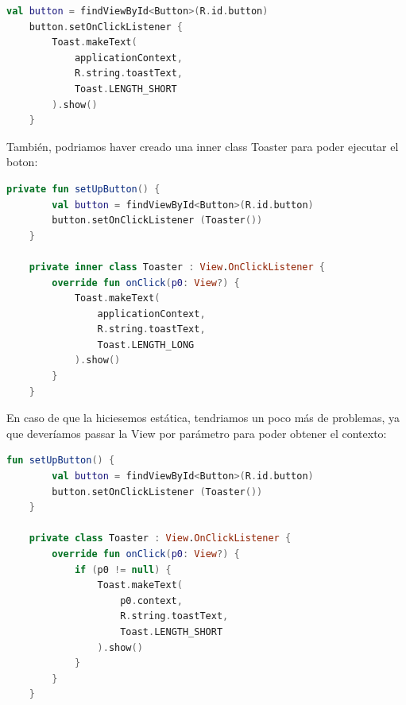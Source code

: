 \documentclass[12pt, letterpaper]{article}
\begin{document}
\begin{lstlisting}[language=Kotlin]
    val button = findViewById<Button>(R.id.button)
    button.setOnClickListener {
        Toast.makeText(
            applicationContext,
            R.string.toastText,
            Toast.LENGTH_SHORT
        ).show()
    }
\end{lstlisting}

También, podriamos haver creado una inner class Toaster para poder ejecutar el boton:
\begin{lstlisting}[language=Kotlin]
    private fun setUpButton() {
        val button = findViewById<Button>(R.id.button)
        button.setOnClickListener (Toaster())
    }

    private inner class Toaster : View.OnClickListener {
        override fun onClick(p0: View?) {
            Toast.makeText(
                applicationContext,
                R.string.toastText,
                Toast.LENGTH_LONG
            ).show()
        }
    }
\end{lstlisting}

En caso de que la hiciesemos estática, tendriamos un poco más de problemas, ya que deveríamos passar la View por parámetro para poder obtener el contexto:
\begin{lstlisting}[language=Kotlin]
    fun setUpButton() {
        val button = findViewById<Button>(R.id.button)
        button.setOnClickListener (Toaster())
    }

    private class Toaster : View.OnClickListener {
        override fun onClick(p0: View?) {
            if (p0 != null) {
                Toast.makeText(
                    p0.context,
                    R.string.toastText,
                    Toast.LENGTH_SHORT
                ).show()
            }
        }
    }
\end{lstlisting}
\end{document}
